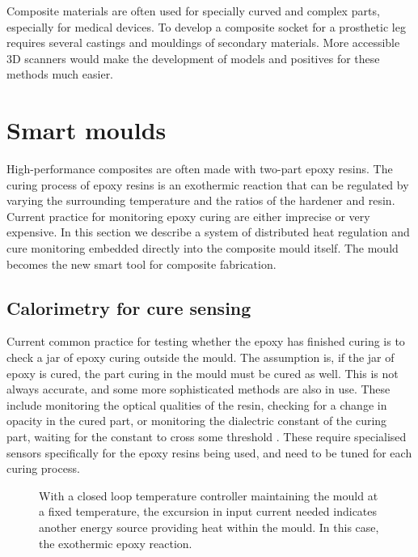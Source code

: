 \documentclass[]{report}
\begin{document}
Composite materials are often used for specially curved and complex parts, especially for medical devices.  To develop a composite socket for a prosthetic leg requires several castings and mouldings of secondary materials.  More accessible 3D scanners would make the development of models and positives for these methods much easier.

\section{Smart moulds}
High-performance composites are often made with two-part epoxy resins.  The curing process of epoxy resins is an exothermic reaction that can be regulated by varying the surrounding temperature and the ratios of the hardener and resin.    Current practice for monitoring epoxy curing are either imprecise or very expensive.  In this section we describe a system of distributed heat regulation and cure monitoring embedded directly into the composite mould itself.   The mould becomes the new smart tool for composite fabrication.

\subsection{Calorimetry for cure sensing}
Current common practice for testing whether the epoxy has finished curing is to check a jar of epoxy curing outside the mould.  The assumption is, if the jar of epoxy is cured, the part curing in the mould must be cured as well.  This is not always accurate, and some more sophisticated methods are also in use.  These include monitoring the optical qualities of the resin, checking for a change in opacity in the cured part, or monitoring the dialectric constant of the curing part, waiting for the constant to cross some threshold \cite{opticalcure, dielectricmonitor}.  These require specialised sensors specifically for the epoxy resins being used, and need to be tuned for each curing process.


\begin{figure}[htbp]
\begin{center}
\end{center}
\caption{With a closed loop temperature controller maintaining the mould at a fixed temperature, the excursion in input current needed indicates another energy source providing heat within the mould.  In this case, the exothermic epoxy reaction.}
\end{figure}
\end{document}
